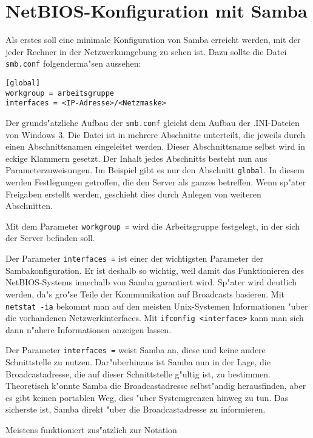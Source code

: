\documentclass{scrartcl}\usepackage{pslatex}\typearea{12}
\newcommand{\prog}{\texttt}
\newcommand{\param}{\texttt}
\newcommand{\dateistyle}{\texttt}
\begin{document}
\section{NetBIOS-Konfiguration mit Samba}

Als erstes soll eine minimale Konfiguration von Samba erreicht werden,
mit der jeder Rechner in der Netzwerkumgebung zu sehen ist. Dazu
sollte die Datei \dateistyle{smb.conf} folgenderma"sen aussehen:

\begin{verbatim}
[global]
workgroup = arbeitsgruppe
interfaces = <IP-Adresse>/<Netzmaske>
\end{verbatim}

\label{aufbau-smb.conf}
Der grunds"atzliche Aufbau der \dateistyle{smb.conf} gleicht dem Aufbau der
.INI-Dateien von Windows 3. Die Datei ist in mehrere Abschnitte
unterteilt, die jeweils durch einen Abschnittsnamen eingeleitet
werden. Dieser Abschnittsname selbst wird in eckige Klammern gesetzt.
Der Inhalt jedes Abschnitts besteht nun aus Parameterzuweisungen. Im
Beispiel gibt es nur den Abschnitt \param{global}. In diesem werden
Festlegungen getroffen, die den Server als ganzes betreffen. Wenn
sp"ater Freigaben erstellt werden, geschieht dies durch Anlegen von
weiteren Abschnitten.

Mit dem Parameter \param{workgroup =} wird die Arbeitsgruppe
festgelegt, in der sich der Server befinden soll.

Der Parameter \label{interfaces}\param{interfaces =} ist einer der
wichtigsten Parameter der Sambakonfiguration. Er ist deshalb so
wichtig, weil damit das Funktionieren des NetBIOS-Systems innerhalb
von Samba garantiert wird. Sp"ater wird deutlich werden, da"s gro"se
Teile der Kommunikation auf Broadcasts basieren. Mit \prog{netstat
  -ia} bekommt man auf den meisten Unix-Systemen Informationen "uber
die vorhandenen Netzwerkinterfaces. Mit \prog{ifconfig <interface>}
kann man sich dann n"ahere Informationen anzeigen lassen.

Der Parameter \param{interfaces =} weist Samba an, diese und keine
andere Schnittstelle zu nutzen. Dar"uberhinaus ist Samba nun in der
Lage, die Broadcastadresse, die auf dieser Schnittstelle g"ultig ist,
zu bestimmen. Theoretisch k"onnte Samba die Broadcastadresse
selbst"andig herausfinden, aber es gibt keinen portablen Weg, dies
"uber Systemgrenzen hinweg zu tun. Das sicherste ist, Samba direkt
"uber die Broadcastadresse zu informieren.

Meistens funktioniert zus"atzlich zur Notation
\end{document}
